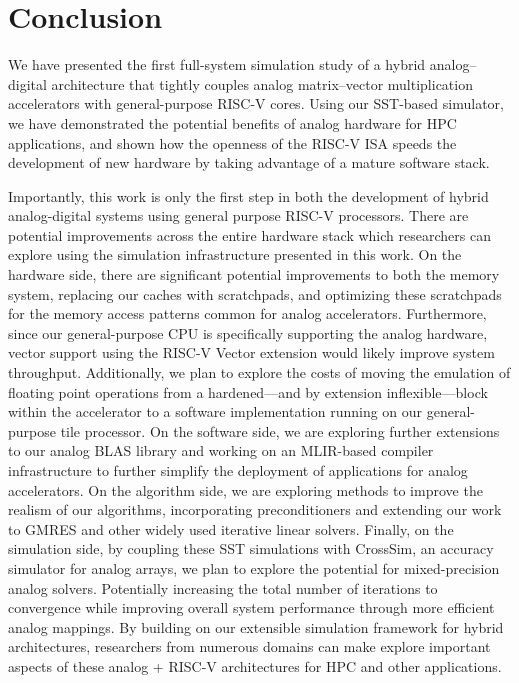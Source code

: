 \section{Conclusion}

We have presented the first full-system simulation study of a hybrid analog–digital architecture that tightly couples analog matrix–vector multiplication accelerators with general-purpose RISC-V cores.
Using our SST-based simulator, we have demonstrated the potential benefits of analog hardware for HPC applications, and shown how the openness of the RISC-V ISA speeds the development of new hardware by taking advantage of a mature software stack.

Importantly, this work is only the first step in both the development of hybrid analog-digital systems using general purpose RISC-V processors.
There are potential improvements across the entire hardware stack which researchers can explore using the simulation infrastructure presented in this work.
On the hardware side, there are significant potential improvements to both the memory system, replacing our caches with scratchpads, and optimizing these scratchpads for the memory access patterns common for analog accelerators.
Furthermore, since our general-purpose CPU is specifically supporting the analog hardware, vector support using the RISC-V Vector extension would likely improve system throughput.
Additionally, we plan to explore the costs of moving the emulation of floating point operations from a hardened---and by extension inflexible---block within the accelerator to a software implementation running on our general-purpose tile processor.
On the software side, we are exploring further extensions to our analog BLAS library and working on an MLIR-based compiler infrastructure to further simplify the deployment of applications for analog accelerators.
On the algorithm side, we are exploring methods to improve the realism of our algorithms, incorporating preconditioners and extending our work to GMRES and other widely used iterative linear solvers.
Finally, on the simulation side, by coupling these SST simulations with CrossSim, an accuracy simulator for analog arrays, we plan to explore the potential for mixed-precision analog solvers.
Potentially increasing the total number of iterations to convergence while improving overall system performance through more efficient analog mappings.
By building on our extensible simulation framework for hybrid architectures, researchers from numerous domains can make explore important aspects of these analog + RISC-V architectures for HPC and other applications.


